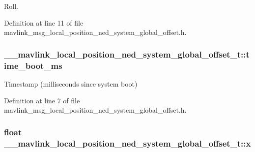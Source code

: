 Roll. 



Definition at line 11 of file mavlink\-\_\-msg\-\_\-local\-\_\-position\-\_\-ned\-\_\-system\-\_\-global\-\_\-offset.\-h.

\hypertarget{struct____mavlink__local__position__ned__system__global__offset__t_a7da6dfcadb9fe7e050d067ab139600c4}{
\subsubsection[{time\-\_\-boot\-\_\-ms}]{ \-\_\-\-\_\-mavlink\-\_\-local\-\_\-position\-\_\-ned\-\_\-system\-\_\-global\-\_\-offset\-\_\-t\-::time\-\_\-boot\-\_\-ms}}\label{struct____mavlink__local__position__ned__system__global__offset__t_a7da6dfcadb9fe7e050d067ab139600c4}


Timestamp (milliseconds since system boot) 



Definition at line 7 of file mavlink\-\_\-msg\-\_\-local\-\_\-position\-\_\-ned\-\_\-system\-\_\-global\-\_\-offset.\-h.

\hypertarget{struct____mavlink__local__position__ned__system__global__offset__t_a35ab546f47a443131ccd805126ae9ca1}{
\subsubsection[{x}]{\setlength{\rightskip}{0pt plus 5cm}float \-\_\-\-\_\-mavlink\-\_\-local\-\_\-position\-\_\-ned\-\_\-system\-\_\-global\-\_\-offset\-\_\-t\-::x}}\label{struct____mavlink__local__position__ned__system__global__offset__t_a35ab546f47a443131ccd805126ae9ca1}



